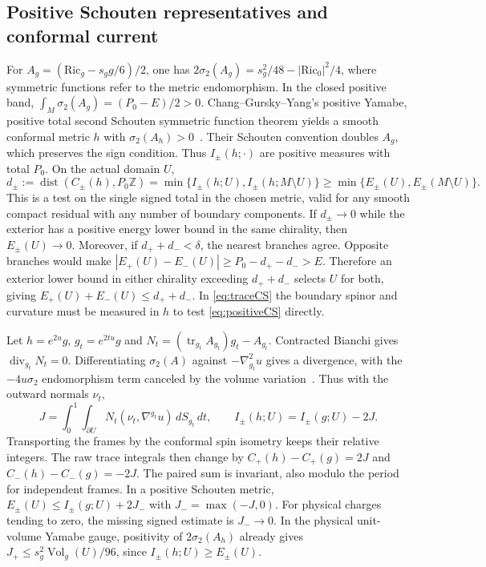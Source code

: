 \documentclass[11pt]{article}
\theoremstyle{remark}
\newcommand{\Ric}{\mathrm{Ric}}
\newcommand{\Vol}{\operatorname{Vol}}
\newcommand{\Tr}{\operatorname{tr}}
\begin{document}
\subsection{Positive Schouten representatives and conformal current}
For \(A_g=(\Ric_g-s_gg/6)/2\), one has
\(2\sigma_2(A_g)=s_g^2/48-|\Ric_0|^2/4\), where symmetric functions refer to the metric endomorphism. In the closed positive band, \(\int_M\sigma_2(A_g)=(P_0-E)/2>0\). Chang--Gursky--Yang's positive Yamabe, positive total second Schouten symmetric function theorem yields a smooth conformal metric \(h\) with \(\sigma_2(A_h)>0\)~\cite[Theorem~A]{ChangGurskyYang2002PositiveRicci}. Their Schouten convention doubles \(A_g\), which preserves the sign condition. Thus \(I_\pm(h;\cdot)\) are positive measures with total \(P_0\). On the actual domain \(U\),
\begin{equation}
 d_\pm:=\operatorname{dist}(C_\pm(h),P_0\mathbb Z)
   =\min\{I_\pm(h;U),I_\pm(h;M\setminus U)\}
   \ge\min\{E_\pm(U),E_\pm(M\setminus U)\}.
 \label{eq:positiveCS}
\end{equation}
This is a test on the single signed total in the chosen metric, valid for any smooth compact residual with any number of boundary components. If \(d_\pm\to0\) while the exterior has a positive energy lower bound in the same chirality, then \(E_\pm(U)\to0\). Moreover, if \(d_++d_-<\delta\), the nearest branches agree. Opposite branches would make \(|E_+(U)-E_-(U)|\ge P_0-d_+-d_->E\). Therefore an exterior lower bound in either chirality exceeding \(d_++d_-\) selects \(U\) for both, giving \(E_+(U)+E_-(U)\le d_++d_-\). In \eqref{eq:traceCS} the boundary spinor and curvature must be measured in \(h\) to test \eqref{eq:positiveCS} directly.

Let \(h=e^{2u}g\), \(g_t=e^{2tu}g\) and \(N_t=(\Tr_{g_t}A_{g_t})g_t-A_{g_t}\). Contracted Bianchi gives \(\operatorname{div}_{g_t}N_t=0\). Differentiating \(\sigma_2(A)\) against \(-\nabla^2_{g_t}u\) gives a divergence, with the \(-4u\sigma_2\) endomorphism term canceled by the volume variation~\cite[\S2.1]{GurskyStreets2018TwoYamabe}. Thus with the outward normals \(\nu_t\),
\begin{equation}
 J=\int_0^1\!\!\int_{\partial U}N_t(\nu_t,\nabla^{g_t}u)\,dS_{g_t}\,dt,
 \qquad
 I_\pm(h;U)=I_\pm(g;U)-2J .
 \label{eq:current}
\end{equation}
Transporting the frames by the conformal spin isometry keeps their relative integers. The raw trace integrals then change by \(C_+(h)-C_+(g)=2J\) and \(C_-(h)-C_-(g)=-2J\). The paired sum is invariant, also modulo the period for independent frames. In a positive Schouten metric, \(E_\pm(U)\le I_\pm(g;U)+2J_-\) with \(J_-=\max(-J,0)\). For physical charges tending to zero, the missing signed estimate is \(J_-\to0\). In the physical unit-volume Yamabe gauge, positivity of \(2\sigma_2(A_h)\) already gives \(J_+\le s_g^2\Vol_g(U)/96\), since \(I_\pm(h;U)\ge E_\pm(U)\).
\end{document}
